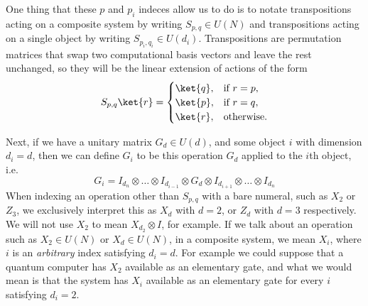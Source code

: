 One thing that these $p$ and $p_i$ indeces allow us to do is to notate transpositions acting on a composite system by writing $S_{p,q} \in U(N)$ and transpositions acting on a single object by writing $S_{p_i,q_i} \in U(d_i)$. Transpositions are permutation matrices that swap two computational basis vectors and leave the rest unchanged, so they will be the linear extension of actions of the form
\[S_{p,q}\ket{r} = \begin{cases}
\ket{q}, & \text{if\ } r = p, \\
\ket{p}, & \text{if\ } r = q, \\
\ket{r}, & \text{otherwise.}
\end{cases}\]

Next, if we have a unitary matrix $G_{d} \in U(d)$, and some object $i$ with dimension $d_i = d$, then we can define $G_i$ to be this operation $G_d$ applied to the $i$th object, i.e. 
\[G_i = I_{d_n}\otimes \dots \otimes I_{d_{i-1}} \otimes G_d \otimes I_{d_{i+1}} \otimes \dots \otimes I_{d_n}\]
When indexing an operation other than $S_{p,q}$ with a bare numeral, such as $X_2$ or $Z_3$, we exclusively interpret this as $X_d$ with $d = 2$, or $Z_d$ with $d = 3$ respectively. We will not use $X_2$ to mean $X_{d_2} \otimes I$, for example. If we talk about an operation such as  $X_2 \in U(N)$ or $X_d \in U(N)$, in a composite system, we mean $X_i$, where $i$ is an \emph{arbitrary} index satisfying $d_i = d$. For example we could suppose that a quantum computer has $X_2$ available as an elementary gate, and what we would mean is that the system has $X_i$ available as an elementary gate for every $i$ satisfying $d_i = 2$.

